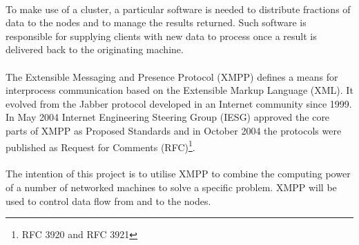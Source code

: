 \paragraph{}
To make use of a cluster, a particular software is needed to distribute fractions of data to the nodes and to manage the results returned. Such software is responsible for supplying clients with new data to process once a result is delivered back to the originating machine.
\paragraph{}
The Extensible Messaging and Presence Protocol (XMPP) defines a means for interprocess communication based on the Extensible Markup Language (XML). It evolved from the Jabber protocol developed in an Internet community since 1999. In May 2004 Internet Engineering Steering Group (IESG) approved the core parts of XMPP \cite{xmpp-core,xmpp-im} as Proposed Standards and in October 2004 the protocols were published as Request for Comments (RFC)\footnote{RFC 3920 and RFC 3921}.
\paragraph{}
The intention of this project is to utilise XMPP to combine the computing power of a number of networked machines to solve a specific problem. XMPP will be used to control data flow from and to the nodes.
